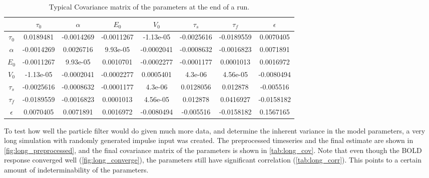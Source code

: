 \begin{table}[t]
\centering
\begin{tabular}{|c | c  c  c  c  c  c  c |}
\hline 
  & $\tau_0$ & $\alpha$ & $E_0$    & $V_0$    & $\tau_s$ & $\tau_f$ & $\epsilon$ \\
\hline 
\rowcolor[gray]{.8} $\tau_0$ &   0.0189481 & -0.0014269 & -0.0011267 & -1.13e-05 & -0.0025616 & -0.0189559 & 0.0070405 \\
$\alpha$ &                       -0.0014269 & 0.0026716 & 9.93e-05 & -0.0002041 & -0.0008632 & -0.0016823 & 0.0071891 \\
\rowcolor[gray]{.8} $E_0$    &   -0.0011267 & 9.93e-05 & 0.0010701 & -0.0002277 & -0.0001177 & 0.0001013 & 0.0016972 \\
$V_0$    &                       -1.13e-05 & -0.0002041 & -0.0002277 & 0.0005401 & 4.3e-06 & 4.56e-05 & -0.0080494 \\
\rowcolor[gray]{.8} $\tau_s$ &   -0.0025616 & -0.0008632 & -0.0001177 & 4.3e-06 & 0.0128056 & 0.012878 & -0.005516 \\
$\tau_f$ &                       -0.0189559 & -0.0016823 & 0.0001013 & 4.56e-05 & 0.012878 & 0.0416927 & -0.0158182 \\
\rowcolor[gray]{.8} $\epsilon$&  0.0070405 & 0.0071891 & 0.0016972 & -0.0080494 & -0.005516 & -0.0158182 & 0.1567165 \\
\hline 
\end{tabular}
\caption{Typical Covariance matrix of the parameters at the end of a run.}
\label{tab:long_corr} 
\end{table}

To test how well the particle filter would do given much more data, and 
determine the inherent variance in the model parameters, a very long simulation
with randomly generated impulse input was created. The preprocessed timeseries
and the final estimate are shown in \autoref{fig:long_preprocessed}, 
 and the final covariance matrix of the parameters is shown in \autoref{tab:long_cov}.
Note that even though the
BOLD response converged well (\autoref{fig:long_converge}),
the parameters still have significant correlation (\autoref{tab:long_corr}). This points
to a certain amount of indeterminability of the parameters. 

